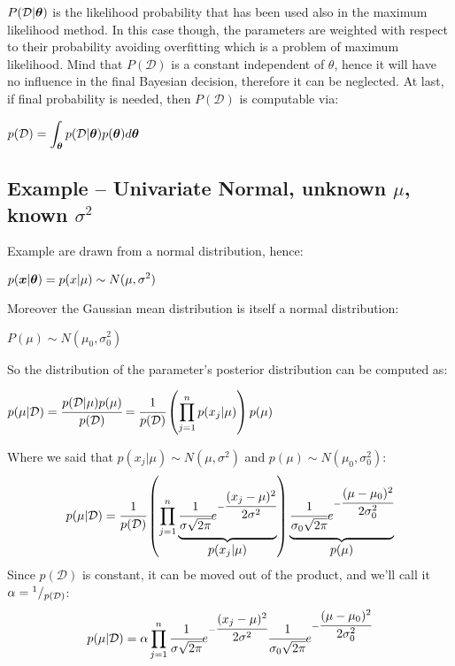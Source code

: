 $P(\mathcal{D}\vert \bm{\theta})$ is the likelihood probability that has been used also in the maximum likelihood method. In this case though, the parameters are weighted with respect to their probability avoiding overfitting which is a problem of maximum likelihood.\newline
Mind that $P(\mathcal{D})$ is a constant independent of $\theta$, hence it will have no influence in the final Bayesian decision, therefore it can be neglected. \newline
At last, if final probability is needed, then $P(\mathcal{D})$ is computable via:
\begin{center}
	$\displaystyle p(\mathcal{D})=\int_{\bm{\theta}}p(\mathcal{D}\vert\bm{\theta})p(\bm{\theta})d\bm{\theta}$
\end{center} 
%
%
\subsection{Example -- Univariate Normal, unknown $\mu$, known $\sigma^2$}
Example are drawn from a normal distribution, hence:
\begin{center}
	$\displaystyle p(\bm{x}\vert\bm{\theta})=p(x\vert\mu)\sim N(\mu, \sigma^2)$
\end{center}
Moreover the Gaussian mean distribution is itself a normal distribution:
\begin{center}
	$\displaystyle P(\mu)\sim N(\mu_0, \sigma_0^2)$
\end{center}
So the distribution of the parameter's posterior distribution can be computed as:
\begin{center}
	$\displaystyle p(\mu\vert\mathcal{D})=\cfrac{p(\mathcal{D}\vert\mu)p(\mu)}{p(\mathcal{D})}=\cfrac{1}{p(\mathcal{D})}\left(\displaystyle\prod_{j=1}^np(x_j\vert\mu)\right)p(\mu)$
\end{center}
Where we said that $p(x_j\vert \mu)\sim N(\mu,\sigma^2)$ and $p(\mu)\sim N(\mu_0,\sigma_0^2)$:
\[
	p(\mu\vert\mathcal{D})=\cfrac{1}{p(\mathcal{D})}\left(\Prod_{j=1}^n
	\underbrace{\cfrac{1}{\sigma\sqrt{2\pi}}e^{-\cfrac{(x_j-\mu)^2}{2\sigma^2}}\rule[-12pt]{0pt}{5pt}}_{\mbox{$p(x_j\vert\mu)$}}\right)
	\underbrace{\cfrac{1}{\sigma_0\sqrt{2\pi}}e^{-\cfrac{(\mu-\mu_0)^2}{2\sigma_0^2}}\rule[-12pt]{0pt}{5pt}}_{\mbox{$p(\mu)$}}
\]
Since $p(\mathcal{D})$ is constant, it can be moved out of the product, and we'll call it $\alpha={}^{1}/_{p(\mathcal{D})}$:
\[
	p(\mu\vert\mathcal{D})=\alpha \displaystyle\prod_{j=1}^n \cfrac{1}{\sigma\sqrt{2\pi}}e^{-\cfrac{(x_j-\mu)^2}{2\sigma^2}}\cfrac{1}{\sigma_0\sqrt{2\pi}}e^{-\cfrac{(\mu-\mu_0)^2}{2\sigma_0^2}}
\]
